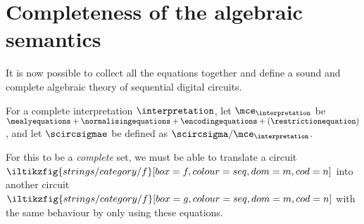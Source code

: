 \section{Completeness of the algebraic semantics}\label{sec:algebraic-completeness}

It is now possible to collect all the equations together and define a sound and
complete algebraic theory of sequential digital circuits.

\begin{definition}
    For a complete interpretation \(\interpretation\), let
    \(\mce_{\interpretation}\) be \(
    \mealyequations +
    \normalisingequations +
    \encodingequations +
    (\restrictionequation)
    \), and let \(\scircsigmae\) be defined as
    \(\scircsigma / \mce_{\interpretation}\).
\end{definition}

For this to be a \emph{complete} set, we must be able to translate
a circuit \(
\iltikzfig{strings/category/f}[box=f,colour=seq,dom=m,cod=n]
\) into another circuit \(
\iltikzfig{strings/category/f}[box=g,colour=seq,dom=m,cod=n]
\) with the same behaviour by only using these equations.

